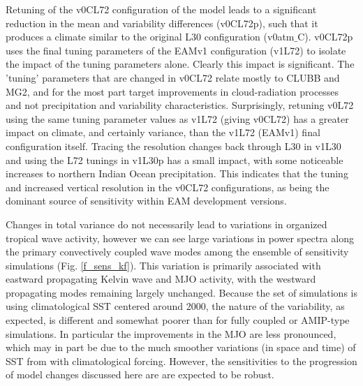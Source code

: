 \documentclass[draft,ms]{AGUTeX}
\begin{document}
\begin{article}
Retuning of the v0CL72 configuration of the model leads to a significant reduction in the mean and variability differences (v0CL72p), such that it produces a climate similar to the original L30 configuration (v0atm$\_$C). v0CL72p uses the final tuning parameters of the EAMv1 configuration (v1L72) to isolate the impact of the tuning parameters alone. Clearly this impact is significant. The 'tuning' parameters that are changed in v0CL72 \citep{Xie2018} relate mostly to CLUBB and MG2, and for the most part target improvements in cloud-radiation processes and not precipitation and variability characteristics. Surprisingly, retuning v0L72 using the same tuning parameter values as v1L72 (giving v0CL72) has a greater impact on climate, and certainly variance, than the v1L72 (EAMv1) final configuration itself. Tracing the resolution changes back through L30 in v1L30 and using the L72 tunings in v1L30p has a small impact, with some noticeable increases to northern Indian Ocean precipitation. This indicates that the tuning and increased vertical resolution in the v0CL72 configurations, as being the dominant source of sensitivity within EAM development versions.

Changes in total variance do not necessarily lead to variations in organized tropical wave activity, however we can see large variations in power spectra along the primary convectively coupled wave modes among the ensemble of sensitivity simulations (Fig. \ref{f_sens_kf}). This variation is primarily associated with eastward propagating Kelvin wave and MJO activity, with the westward propagating modes remaining largely unchanged. Because the set of simulations is using climatological SST centered around 2000, the nature of the variability, as expected, is different and somewhat poorer than for fully coupled or AMIP-type simulations. In particular the improvements in the MJO are less pronounced, which may in part be due to the much smoother variations (in space and time) of SST from with climatological forcing. However, the sensitivities to the progression of model changes discussed here are are expected to be robust.


\end{article}
\end{document}
